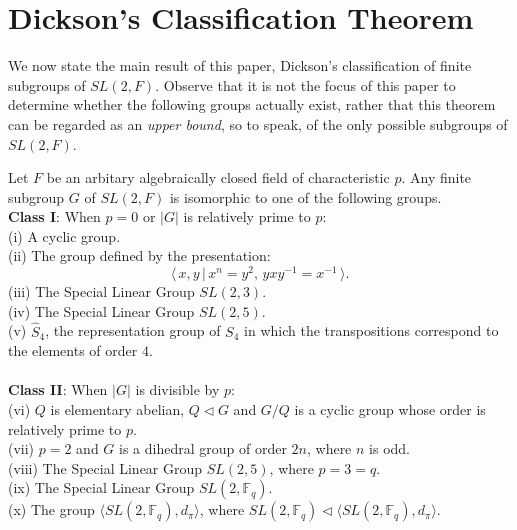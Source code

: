 \section{Dickson's Classification Theorem}

We now state the main result of this paper, Dickson's classification of finite subgroups of $SL(2,F)$. Observe that it is not the focus of this paper to determine whether the following groups actually exist, rather that this theorem can be regarded as an \textit{upper bound}, so to speak, of the only possible subgroups of $SL(2,F)$.\\

\begin{theorem}\label{mainresult} Let $F$ be an arbitary algebraically closed field of characteristic $p$. Any finite subgroup $G$ of $SL(2,F)$ is isomorphic to one of the following groups. \vspace{3mm} \\
\textbf{Class I}: When $p=0$ or $|G|$ is relatively prime to $p$: \vspace{1mm} \\
(i) A cyclic group. \vspace{3mm} \\
(ii) The group defined by the presentation:
\begin{equation*} \langle \, x,y \, | \, x^n = y^2, \, yxy^{-1} = x^{-1} \, \rangle.
\end{equation*}
(iii) The Special Linear Group $SL(2,3)$. \vspace{3mm} \\
(iv) The Special Linear Group $SL(2,5)$. \vspace{3mm} \\
(v) $\widehat{S}_4$, the representation group of $S_4$ in which the transpositions correspond to the elements of order $4$. \\
\\
\textbf{Class II}: When $|G|$ is divisible by $p$: \vspace{1mm} \\
(vi) $Q$ is elementary abelian, $Q \vartriangleleft G$ and $G/Q$ is a cyclic group whose order is relatively prime to $p$. \vspace{3mm} \\
(vii) $p=2$ and $G$ is a dihedral group of order $2n$, where $n$ is odd. \vspace{3mm} \\
(viii) The Special Linear Group $SL(2,5)$, where $p=3=q$. \vspace{3mm} \\
(ix) The Special Linear Group $SL(2,\mathbb{F}_q)$. \vspace{3mm} \\
(x) The group $\langle SL(2,\mathbb{F}_q), d_\pi \rangle$, where $SL(2,\mathbb{F}_q) \vartriangleleft \langle SL(2,\mathbb{F}_q), d_\pi \rangle$. \vspace{3mm} \\


\end{theorem}
